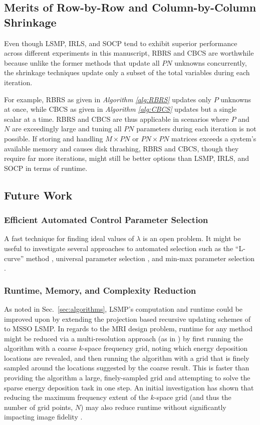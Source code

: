 \documentclass[final]{siamltex}
\begin{document}
   \subsection{Merits of Row-by-Row and Column-by-Column Shrinkage}
   Even though LSMP, IRLS, and SOCP tend to exhibit superior
   performance across different experiments in this manuscript, RBRS
   and CBCS are worthwhile because unlike the former methods
   that update all $PN$ unknowns concurrently, the shrinkage
   techniques update only a subset of the total variables during each
   iteration.

   For example, RBRS as given in {\em{Algorithm \ref{alg:RBRS}}}
   updates only $P$ unknowns at once, while CBCS as given in
   {\em{Algorithm \ref{alg:CBCS}}} updates but a single scalar at a
   time.  RBRS and CBCS are thus applicable in scenarios where $P$ and
   $N$ are exceedingly large and tuning all $PN$ parameters during
   each iteration is not possible.  If storing and handling $M \times
   PN$ or $PN \times PN$ matrices exceeds a system's available memory
   and causes disk thrashing, RBRS and CBCS, though they require far
   more iterations, might still be better options than LSMP, IRLS, and
   SOCP in terms of runtime.

   \subsection{Future Work}

   \subsubsection{Efficient Automated Control Parameter Selection} A
   fast technique for finding ideal values of $\lambda$ is an open
   problem.  It might be useful to investigate several approaches to
   automated selection such as the ``L-curve'' method \cite{Han1994},
   universal parameter selection \cite{Don1994}, and min-max parameter
   selection \cite{Joh1994}.

   \subsubsection{Runtime, Memory, and Complexity Reduction} As noted
   in Sec.~\ref{sec:algorithms}, LSMP's computation and runtime could
   be improved upon by extending the projection based recursive
   updating schemes of \cite{Cot1999, Cot2005} to MSSO LSMP\@.  In
   regards to the MRI design problem, runtime for any method might be
   reduced via a multi-resolution approach (as in \cite{Mal2005}) by
   first running the algorithm with a coarse $k$-space frequency grid,
   noting which energy deposition locations are revealed, and then
   running the algorithm with a grid that is finely sampled around the
   locations suggested by the coarse result.  This is faster than
   providing the algorithm a large, finely-sampled grid and attempting
   to solve the sparse energy deposition task in one step.  An initial
   investigation has shown that reducing the maximum frequency extent
   of the $k$-space grid (and thus the number of grid points, $N$) may
   also reduce runtime without significantly impacting image fidelity
   \cite{Zel2008_TMI}.
\end{document}

